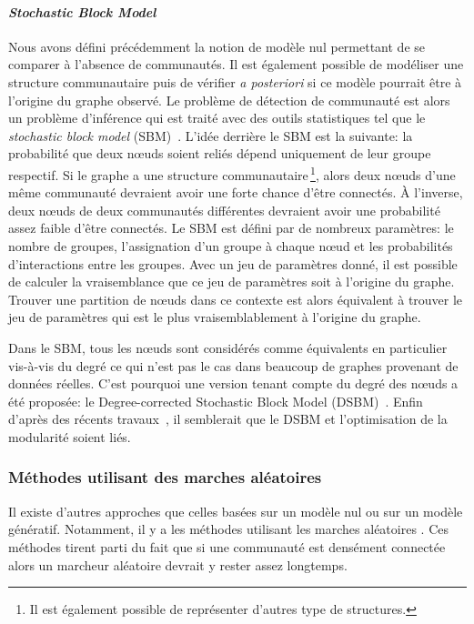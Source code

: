 \paragraph{\emph{Stochastic Block Model}}
Nous avons défini précédemment la notion de modèle nul permettant de se comparer à l'absence de communautés.
Il est également possible de modéliser une structure communautaire puis de vérifier \emph{a posteriori} si ce modèle pourrait être à l'origine du graphe observé.
Le problème de détection de communauté est alors un problème d'inférence qui est traité avec des outils statistiques tel que le \emph{stochastic block model} (SBM)~\cite{Holland1983a,Nowicki2001}.
L'idée derrière le SBM est la suivante: la probabilité que deux n\oe{}uds soient reliés dépend uniquement de leur groupe respectif.
Si le graphe a une structure communautaire\,\footnote{Il est également possible de représenter d'autres type de structures.}, alors deux n\oe{}uds d'une même communauté devraient avoir une forte chance d'être connectés.
\`A l'inverse, deux n\oe{}uds de deux communautés différentes devraient avoir une probabilité assez faible d'être connectés.
Le SBM est défini par de nombreux paramètres: le nombre de groupes, l'assignation d'un groupe à chaque n\oe{}ud et les probabilités d'interactions entre les groupes.
Avec un jeu de paramètres donné, il est possible de calculer la vraisemblance que ce jeu de paramètres soit à l'origine du graphe.
Trouver une partition de n\oe{}uds dans ce contexte est alors équivalent à trouver le jeu de paramètres qui est le plus vraisemblablement à l'origine du graphe.


Dans le SBM, tous les n\oe{}uds sont considérés comme équivalents en particulier vis-à-vis du degré ce qui n'est pas le cas dans beaucoup de graphes provenant de données réelles.
C'est pourquoi une version tenant compte du degré des n\oe{}uds a été proposée: le Degree-corrected Stochastic Block Model (DSBM)~\cite{Karrer2011}.
Enfin d'après des récents travaux~\cite{Newman2016}, il semblerait que le DSBM et l'optimisation de la modularité soient liés.

\subsubsection{Méthodes utilisant des marches aléatoires}
Il existe d'autres approches que celles basées sur un modèle nul ou sur un modèle génératif.
Notamment, il y a les méthodes utilisant les marches aléatoires \cite{Pons2005,Rosvall2008}.
Ces méthodes tirent parti du fait que si une communauté est densément connectée alors un marcheur aléatoire devrait y rester assez longtemps.

